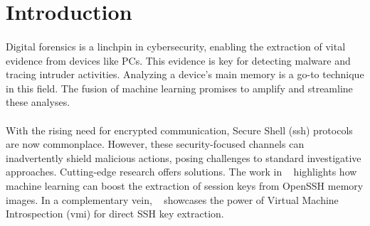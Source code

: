 \section{Introduction}\label{chap:introduction}

\begin{comment}
Motivate your research and outline the research gap in this chapter. Why is your thesis relevant and what do you address, what has not been addressed before. 

General Requirements to the thesis:

\begin{itemize}
	\item 60 pages of content in this format. Content does not include table of content, lists, appendices etc.
	\item Proper scientific referencing
	\item Introduction and Background should be less than 50\% of the thesis
	\item Images should be readable and in the proper size. 
\end{itemize}
\end{comment}
 

\paragraph*{}Digital forensics is a linchpin in cybersecurity, enabling the extraction of vital evidence from devices like PCs. This evidence is key for detecting malware and tracing intruder activities. Analyzing a device's main memory is a go-to technique in this field. The fusion of machine learning promises to amplify and streamline these analyses.

\paragraph*{}With the rising need for encrypted communication, Secure Shell (\acrshort{ssh}) protocols are now commonplace. However, these security-focused channels can inadvertently shield malicious actions, posing challenges to standard investigative approaches. Cutting-edge research offers solutions. The work in ~\cite*{fellicious_smartkex_2022} highlights how machine learning can boost the extraction of session keys from OpenSSH memory images. In a complementary vein, ~\cite*{sentanoe_sshkex_2022} showcases the power of Virtual Machine Introspection (\acrshort{vmi}) for direct SSH key extraction.

